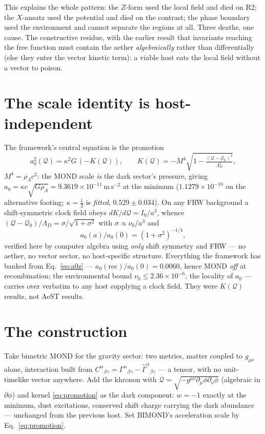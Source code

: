 \documentclass[aps,prd,twocolumn,10pt,nofootinbib,superscriptaddress]{revtex4-2}
\newcommand{\QQ}{\mathcal{Q}}
\begin{document}
This explains the whole pattern: the $Z$-form used the local field and died on R2; the
$X$-ansatz used the potential and died on the contrast; the phase boundary used the environment
and cannot separate the regions at all. Three deaths, one cause. The constructive residue,
with the earlier result that invariants reaching the free function must contain the aether
\emph{algebraically} rather than differentially (else they enter the vector kinetic term):
a viable host eats the local field without a vector to poison.

\section{The scale identity is host-independent}

The framework's central equation is the promotion
\begin{equation}
a_0^2(\QQ)=\kappa^2 G\,(-K(\QQ)),\qquad
K(\QQ)=-M^4\sqrt{1-\tfrac{(\QQ-\QQ_0)^2}{\Lambda_D^2}},
\label{eq:promotion}
\end{equation}
$M^4=\rho_\Lambda c^2$: the MOND scale \emph{is} the dark sector's pressure, giving
$a_0=\kappa c\sqrt{G\rho_\Lambda}=9.3619\times10^{-11}\,\mathrm{m\,s^{-2}}$ at the minimum
($1.1279\times10^{-10}$ on the alternative footing; $\kappa=\tfrac12$ is \emph{fitted},
$0.529\pm0.034$). On any FRW background a shift-symmetric clock field obeys
$dK/d\QQ=I_0/a^3$, whence $(\QQ-\QQ_0)/\Lambda_D=\sigma/\sqrt{1+\sigma^2}$ with
$\sigma\propto\nu_0/a^3$ and
\begin{equation}
a_0(a)/a_0(0)=(1+\sigma^2)^{-1/4},
\label{eq:a0z}
\end{equation}
verified here by computer algebra using \emph{only} shift symmetry and FRW --- no aether, no
vector sector, no host-specific structure. Everything the framework has banked from
Eq.~\eqref{eq:a0z} --- $a_0(\mathrm{rec})/a_0(0)=0.0060$, hence MOND \emph{off} at recombination;
the environmental bound $\nu_0\le2.36\times10^{-6}$; the locality of $a_0$ --- carries over
verbatim to any host supplying a clock field. They were $K(\QQ)$ results, not AeST results.

\section{The construction}

Take bimetric MOND \cite{BIMOND} for the gravity sector: two metrics, matter coupled to
$g_{\mu\nu}$ alone, interaction built from $C^\alpha{}_{\beta\gamma}=
\Gamma^\alpha{}_{\beta\gamma}-\hat\Gamma^\alpha{}_{\beta\gamma}$ --- a tensor, with no
unit-timelike vector anywhere. Add the khronon with $\QQ=\sqrt{-g^{\mu\nu}
\partial_\mu\phi\partial_\nu\phi}$ (algebraic in $\partial\phi$) and kernel
\eqref{eq:promotion} as the dark component: $w=-1$ exactly at the minimum, dust excitations,
conserved shift charge carrying the dark abundance --- unchanged from the previous host. Set
BIMOND's acceleration scale by Eq.~\eqref{eq:promotion}.
\end{document}
